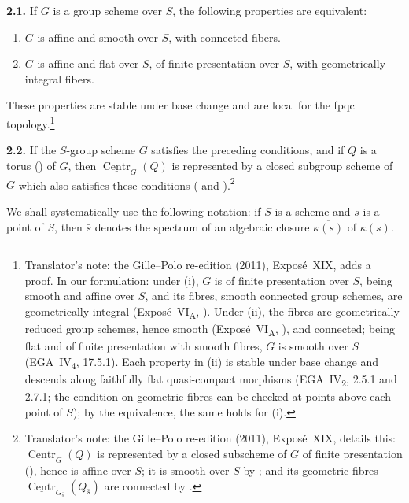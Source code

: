 
\par\medskip\noindent
\textbf{2.1.}\quad
If \(G\) is a group scheme over \(S\), the following properties are
equivalent:
\begin{enumerate}
\item[\SGAInlineRefTarget{sga3:xix:section:2:item:i}(i)] \(G\) is affine and smooth over \(S\), with connected
  fibers.
\item[\SGAInlineRefTarget{sga3:xix:section:2:item:ii}(ii)] \(G\) is affine and flat over \(S\), of finite presentation
  over \(S\), with geometrically integral fibers.
\end{enumerate}
These properties are stable under base change and are local for the
fpqc topology.\footnote{Translator's note: the Gille--Polo re-edition (2011), Exposé~XIX, adds a proof. In our
formulation: under (i), \(G\) is of finite presentation over \(S\), being
smooth and affine over \(S\), and its fibres, smooth connected group schemes,
are geometrically integral (Exposé~VI\textsubscript{A}, ). Under (ii), the
fibres are geometrically reduced group schemes, hence smooth
(Exposé~VI\textsubscript{A}, ), and connected; being flat and of finite
presentation with smooth fibres, \(G\) is smooth over \(S\)
(EGA~IV\textsubscript{4}, 17.5.1). Each property in (ii) is stable under base
change and descends along faithfully flat quasi-compact morphisms
(EGA~IV\textsubscript{2}, 2.5.1 and 2.7.1; the condition on geometric fibres
can be checked at points above each point of \(S\)); by the equivalence, the
same holds for (i).}

\par\medskip\noindent{}\textbf{2.2.}\quad
If the \(S\)-group scheme \(G\) satisfies the preceding conditions, and if
\(Q\) is a torus \textup{()} of \(G\), then
\(\underline{\operatorname{Centr}}_{G}(Q)\) is represented by a closed
subgroup scheme of \(G\) which also satisfies these conditions
( and ).\footnote{Translator's note: the Gille--Polo re-edition (2011), Exposé~XIX, details
this: \(\underline{\operatorname{Centr}}_G(Q)\) is represented by a closed
subscheme of \(G\) of finite presentation (), hence is
affine over \(S\); it is smooth over \(S\) by ; and its
geometric fibres \(\underline{\operatorname{Centr}}_{G_{\bar s}}(Q_{\bar s})\)
are connected by .}

We shall systematically use the following notation: if \(S\) is a scheme
and \(s\) is a point of \(S\), then \(\bar s\) denotes the spectrum of an
algebraic closure \(\overline{\kappa(s)}\) of \(\kappa(s)\).
